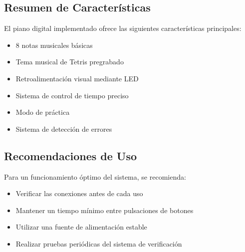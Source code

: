 \subsection{Resumen de Características}
El piano digital implementado ofrece las siguientes características principales:
\begin{itemize}
\item 8 notas musicales básicas
\item Tema musical de Tetris pregrabado
\item Retroalimentación visual mediante LED
\item Sistema de control de tiempo preciso
\item Modo de práctica
\item Sistema de detección de errores
\end{itemize}

\subsection{Recomendaciones de Uso}
Para un funcionamiento óptimo del sistema, se recomienda:
\begin{itemize}
\item Verificar las conexiones antes de cada uso
\item Mantener un tiempo mínimo entre pulsaciones de botones
\item Utilizar una fuente de alimentación estable
\item Realizar pruebas periódicas del sistema de verificación
\end{itemize}